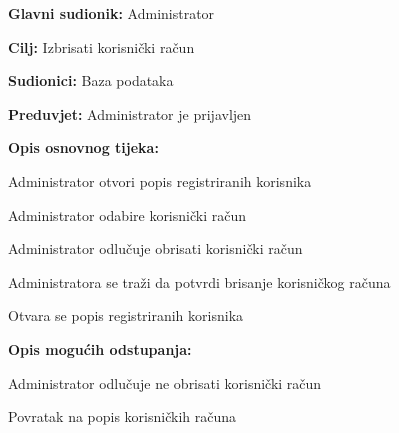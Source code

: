 					\noindent {}
					\begin{packed_item}
						
						\item \textbf{Glavni sudionik: }Administrator
						\item  \textbf{Cilj:} Izbrisati korisnički račun
						\item  \textbf{Sudionici:} Baza podataka
						\item  \textbf{Preduvjet:} Administrator je prijavljen
						\item  \textbf{Opis osnovnog tijeka:}
						
						\item[] \begin{packed_enum}
							
							\item Administrator otvori popis registriranih korisnika
							\item Administrator odabire korisnički račun
							\item Administrator odlučuje obrisati korisnički račun
							\item Administratora se traži da potvrdi brisanje korisničkog računa
							\item Otvara se popis registriranih korisnika
						\end{packed_enum}
						
						\item  \textbf{Opis mogućih odstupanja:}
						
						\item[] \begin{packed_item}
							
							\item[4.a] Administrator odlučuje ne obrisati korisnički račun
							\item[] \begin{packed_enum}			
								\item Povratak na popis korisničkih računa
							\end{packed_enum}
						\end{packed_item}
					\end{packed_item}
					
